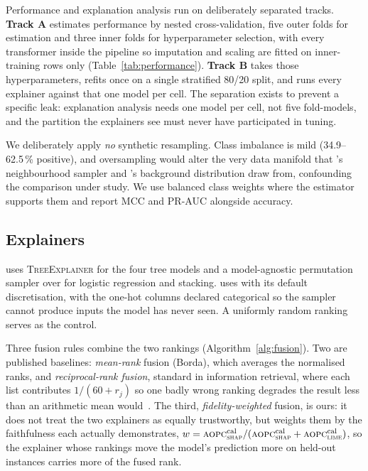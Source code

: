 Performance and explanation analysis run on deliberately separated tracks.
\textbf{Track A} estimates performance by nested cross-validation, five outer folds
for estimation and three inner folds for hyperparameter selection, with every
transformer inside the pipeline so imputation and scaling are fitted on inner-training
rows only (Table~\ref{tab:performance}). \textbf{Track B} takes those hyperparameters,
refits once on a single stratified 80/20 split, and runs every explainer against that
one model per cell. The separation exists to prevent a specific leak: explanation
analysis needs one model per cell, not five fold-models, and the partition the
explainers see must never have participated in tuning.

We deliberately apply \emph{no} synthetic resampling. Class imbalance is mild
(34.9--62.5\,\% positive), and oversampling would alter the very data manifold that
\lime{}'s neighbourhood sampler and \shap{}'s background distribution draw from,
confounding the comparison under study. We use balanced class weights where the
estimator supports them and report MCC and PR-AUC alongside accuracy.

\subsection{Explainers}\label{sec:method-explainers}
\shap{} uses \textsc{TreeExplainer} for the four tree models and a model-agnostic
permutation sampler over  for logistic regression and stacking.
\lime{} uses  with its default discretisation, with the
one-hot columns declared categorical so the sampler cannot produce inputs the model
has never seen. A uniformly random ranking serves as the control.

Three fusion rules combine the two rankings (Algorithm~\ref{alg:fusion}). Two are
published baselines: \emph{mean-rank} fusion (Borda), which averages the normalised
ranks, and \emph{reciprocal-rank fusion}, standard in information retrieval, where each
list contributes $1/(60+r_j)$ so one badly wrong ranking degrades the result less than
an arithmetic mean would~\cite{cormack2009reciprocal}. The third,
\emph{fidelity-weighted} fusion, is ours: it does not treat the two explainers as
equally trustworthy, but weights them by the faithfulness each actually demonstrates,
$w = \textsc{aopc}{}^{\text{cal}}_{\textsc{shap}} / (\textsc{aopc}{}^{\text{cal}}_{\textsc{shap}} +
\textsc{aopc}{}^{\text{cal}}_{\textsc{lime}})$, so the explainer whose rankings move the model's
prediction more on held-out instances carries more of the fused rank.

